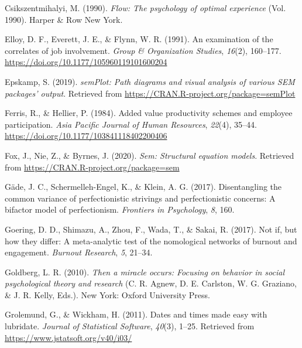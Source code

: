 \documentclass[
  man]{apa7}
\newlength{\cslhangindent}
\newlength{\cslentryspacingunit} %
\newenvironment{CSLReferences}[2] %
 {%
  \setlength{\parindent}{0pt}
  \ifodd #1
  \let\oldpar\par
  \def\par{\hangindent=\cslhangindent\oldpar}
  \fi
  \setlength{\parskip}{#2\cslentryspacingunit}
 }%
 {}
\begin{document}
\begin{CSLReferences}{1}{0}
\leavevmode{}%
Csikszentmihalyi, M. (1990). \emph{Flow: The psychology of optimal experience} (Vol. 1990). Harper \& Row New York.

\leavevmode{}%
Elloy, D. F., Everett, J. E., \& Flynn, W. R. (1991). An examination of the correlates of job involvement. \emph{Group \& Organization Studies}, \emph{16}(2), 160--177. \url{https://doi.org/10.1177/105960119101600204}

\leavevmode{}%
Epskamp, S. (2019). \emph{semPlot: Path diagrams and visual analysis of various SEM packages' output}. Retrieved from \url{https://CRAN.R-project.org/package=semPlot}

\leavevmode{}%
Ferris, R., \& Hellier, P. (1984). Added value productivity schemes and employee participation. \emph{Asia Pacific Journal of Human Resources}, \emph{22}(4), 35--44. \url{https://doi.org/10.1177/103841118402200406}

\leavevmode{}%
Fox, J., Nie, Z., \& Byrnes, J. (2020). \emph{Sem: Structural equation models}. Retrieved from \url{https://CRAN.R-project.org/package=sem}

\leavevmode{}%
Gäde, J. C., Schermelleh-Engel, K., \& Klein, A. G. (2017). Disentangling the common variance of perfectionistic strivings and perfectionistic concerns: A bifactor model of perfectionism. \emph{Frontiers in Psychology}, \emph{8}, 160.

\leavevmode{}%
Goering, D. D., Shimazu, A., Zhou, F., Wada, T., \& Sakai, R. (2017). Not if, but how they differ: A meta-analytic test of the nomological networks of burnout and engagement. \emph{Burnout Research}, \emph{5}, 21--34.

\leavevmode{}%
Goldberg, L. R. (2010). \emph{Then a miracle occurs: Focusing on behavior in social psychological theory and research} (C. R. Agnew, D. E. Carlston, W. G. Graziano, \& J. R. Kelly, Eds.). New York: Oxford University Press.

\leavevmode{}%
Grolemund, G., \& Wickham, H. (2011). Dates and times made easy with {lubridate}. \emph{Journal of Statistical Software}, \emph{40}(3), 1--25. Retrieved from \url{https://www.jstatsoft.org/v40/i03/}


\end{CSLReferences}
\end{document}

